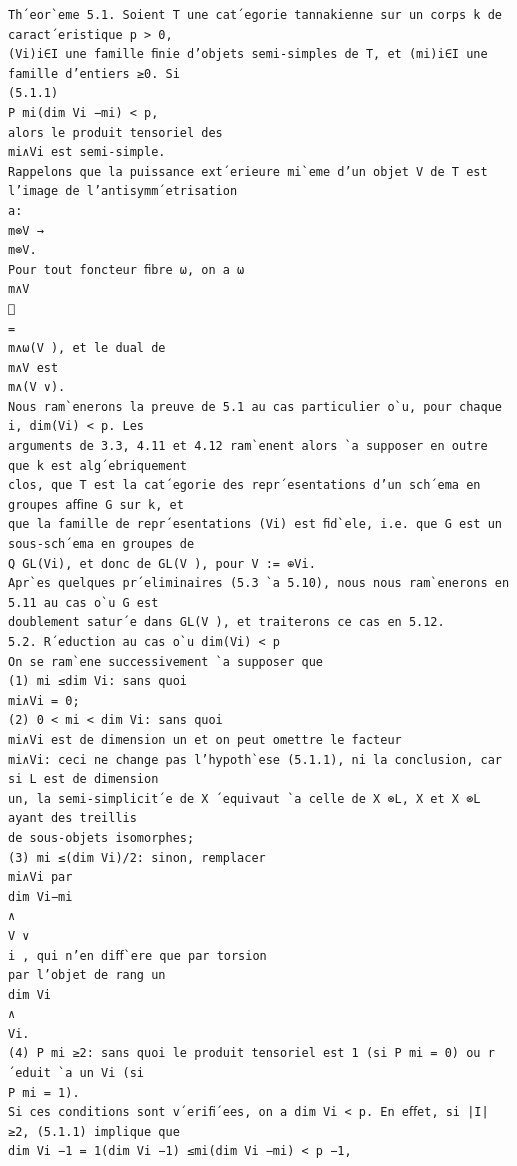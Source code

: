 \documentclass[10pt]{article}
\begin{document}
\begin{verbatim}
Th´eor`eme 5.1. Soient T une cat´egorie tannakienne sur un corps k de caract´eristique p > 0,
(Vi)i∈I une famille ﬁnie d’objets semi-simples de T, et (mi)i∈I une famille d’entiers ≥0. Si
(5.1.1)
P mi(dim Vi −mi) < p,
alors le produit tensoriel des
mi∧Vi est semi-simple.
Rappelons que la puissance ext´erieure mi`eme d’un objet V de T est l’image de l’antisymm´etrisation
a:
m⊗V →
m⊗V.
Pour tout foncteur ﬁbre ω, on a ω
 m∧V

=
m∧ω(V ), et le dual de
m∧V est
m∧(V ∨).
Nous ram`enerons la preuve de 5.1 au cas particulier o`u, pour chaque i, dim(Vi) < p. Les
arguments de 3.3, 4.11 et 4.12 ram`enent alors `a supposer en outre que k est alg´ebriquement
clos, que T est la cat´egorie des repr´esentations d’un sch´ema en groupes aﬃne G sur k, et
que la famille de repr´esentations (Vi) est ﬁd`ele, i.e. que G est un sous-sch´ema en groupes de
Q GL(Vi), et donc de GL(V ), pour V := ⊕Vi.
Apr`es quelques pr´eliminaires (5.3 `a 5.10), nous nous ram`enerons en 5.11 au cas o`u G est
doublement satur´e dans GL(V ), et traiterons ce cas en 5.12.
5.2. R´eduction au cas o`u dim(Vi) < p
On se ram`ene successivement `a supposer que
(1) mi ≤dim Vi: sans quoi
mi∧Vi = 0;
(2) 0 < mi < dim Vi: sans quoi
mi∧Vi est de dimension un et on peut omettre le facteur
mi∧Vi: ceci ne change pas l’hypoth`ese (5.1.1), ni la conclusion, car si L est de dimension
un, la semi-simplicit´e de X ´equivaut `a celle de X ⊗L, X et X ⊗L ayant des treillis
de sous-objets isomorphes;
(3) mi ≤(dim Vi)/2: sinon, remplacer
mi∧Vi par
dim Vi−mi
∧
V ∨
i , qui n’en diﬀ`ere que par torsion
par l’objet de rang un
dim Vi
∧
Vi.
(4) P mi ≥2: sans quoi le produit tensoriel est 1 (si P mi = 0) ou r´eduit `a un Vi (si
P mi = 1).
Si ces conditions sont v´eriﬁ´ees, on a dim Vi < p. En eﬀet, si |I| ≥2, (5.1.1) implique que
dim Vi −1 = 1(dim Vi −1) ≤mi(dim Vi −mi) < p −1,


\end{verbatim}
\end{document}
